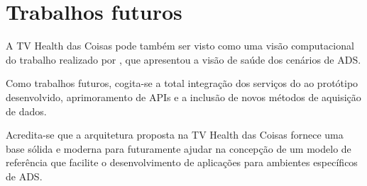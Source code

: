 \section{Trabalhos futuros} \label{sec:trabalhos-futuros}

A TV Health das Coisas pode também ser visto como uma visão computacional do
trabalho realizado por \citeauthor{santos2014}, que apresentou a visão de saúde
dos cenários de ADS. 

Como trabalhos futuros, cogita-se a total integração dos serviços do \nextsaude[]
ao protótipo desenvolvido, aprimoramento de APIs e a inclusão de novos métodos de 
aquisição de dados.

Acredita-se que a arquitetura proposta na TV Health das Coisas fornece uma base
sólida e moderna para futuramente ajudar na concepção de um modelo de
referência que facilite o desenvolvimento de aplicações para ambientes
específicos de ADS. 

